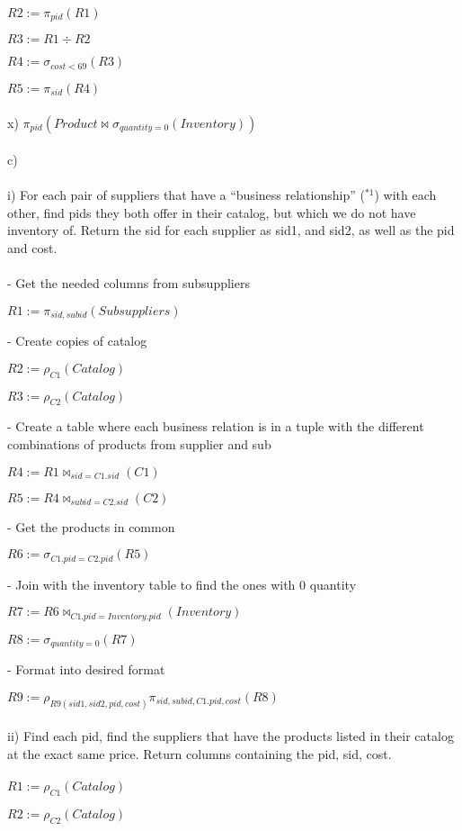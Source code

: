 \documentclass[10pt]{article}
\begin{document}
$R2 := \pi_{pid}(R1)$

$R3 := R1 \div R2$

$R4 := \sigma_{cost<69}(R3)$

$R5 := \pi_{sid}(R4)$
\\~\\
x) $\pi_{pid}(Product \bowtie \sigma_{quantity=0}(Inventory))$
\\~\\
c)
\\~\\
i) For each pair of suppliers that have a “business relationship” ($^{*1}$) with each other, find pids they both offer in their catalog, but which we do not have inventory of. Return the sid for each supplier as sid1, and sid2, as well as the pid and cost. 
\\~\\
- Get the needed columns from subsuppliers

$R1 := \pi_{sid, subid}(Subsuppliers)$

- Create copies of catalog

$R2 := \rho_{C1}(Catalog)$

$R3 := \rho_{C2}(Catalog)$

- Create a table where each business relation is in a tuple with the different combinations of products from supplier and sub

$R4 := R1 \bowtie_{sid = C1.sid}(C1)$

$R5 := R4 \bowtie_{subid = C2.sid}(C2)$

- Get the products in common

$R6 := \sigma_{C1.pid = C2.pid}(R5)$

- Join with the inventory table to find the ones with 0 quantity

$R7 := R6 \bowtie_{C1.pid = Inventory.pid}(Inventory)$

$R8 := \sigma_{quantity = 0}(R7)$

- Format into desired format

$R9 := \rho_{R9(sid1, sid2, pid, cost)}\pi_{sid, subid, C1.pid, cost}(R8)$
\\~\\
ii) Find each pid, find the suppliers that have the products listed in their catalog at the exact same price. Return columns containing the pid, sid, cost. 
\\~\\
$R1 := \rho_{C1}(Catalog)$

$R2 := \rho_{C2}(Catalog)$
\end{document}
